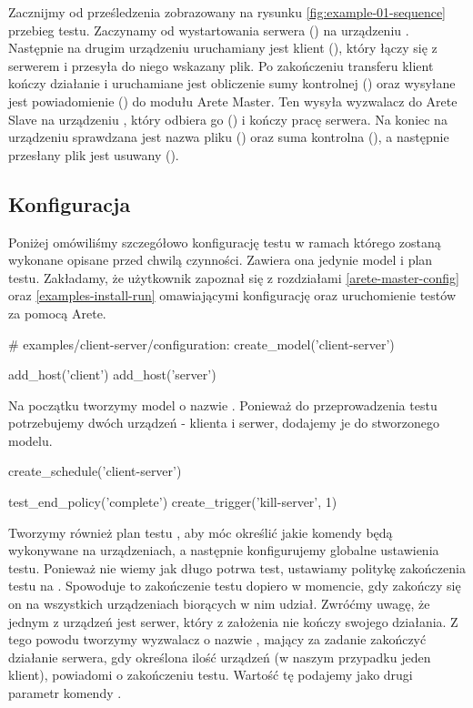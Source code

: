 \documentclass[00-praca-magisterska.tex]{subfiles}
\begin{document}
Zacznijmy od prześledzenia zobrazowany na rysunku \ref{fig:example-01-sequence}
przebieg testu. Zaczynamy od wystartowania serwera () na urządzeniu
.  Następnie na drugim urządzeniu uruchamiany jest klient
(), który łączy się z serwerem i przesyła do niego wskazany plik. Po
zakończeniu transferu klient kończy działanie i uruchamiane jest obliczenie sumy
kontrolnej () oraz wysyłane jest powiadomienie () do modułu
Arete Master. Ten wysyła wyzwalacz do Arete Slave na urządzeniu ,
który odbiera go () i kończy pracę serwera. Na koniec na urządzeniu
 sprawdzana jest nazwa pliku () oraz suma kontrolna
(), a następnie przesłany plik jest usuwany ().

\subsection{Konfiguracja}

Poniżej omówiliśmy szczegółowo konfigurację testu w ramach którego zostaną
wykonane opisane przed chwilą czynności. Zawiera ona jedynie model i plan testu.
Zakładamy, że użytkownik zapoznał się z rozdziałami \ref{arete-master-config}
oraz \ref{examples-install-run} omawiającymi konfigurację oraz uruchomienie
testów za pomocą Arete.

\begin{pythoncode}
  # examples/client-server/configuration:
  create_model('client-server')

  add_host('client')
  add_host('server')
\end{pythoncode}

Na początku tworzymy model o nazwie . Ponieważ do
przeprowadzenia testu potrzebujemy dwóch urządzeń - klienta i serwer, dodajemy
je do stworzonego modelu. 

\begin{pythoncode}
  create_schedule('client-server')

  test_end_policy('complete')
  create_trigger('kill-server', 1)
\end{pythoncode}

Tworzymy również plan testu , aby móc określić jakie komendy
będą wykonywane na urządzeniach, a następnie konfigurujemy globalne ustawienia
testu. Ponieważ nie wiemy jak długo potrwa test, ustawiamy politykę zakończenia
testu na . Spowoduje to zakończenie testu dopiero w momencie, gdy
zakończy się on na wszystkich urządzeniach biorących w nim udział. Zwróćmy
uwagę, że jednym z urządzeń jest serwer, który z założenia nie kończy swojego
działania. Z tego powodu tworzymy wyzwalacz o nazwie , mający
za zadanie zakończyć działanie serwera, gdy określona ilość urządzeń (w naszym
przypadku jeden klient), powiadomi o zakończeniu testu. Wartość tę podajemy jako
drugi parametr komendy .
\end{document}
